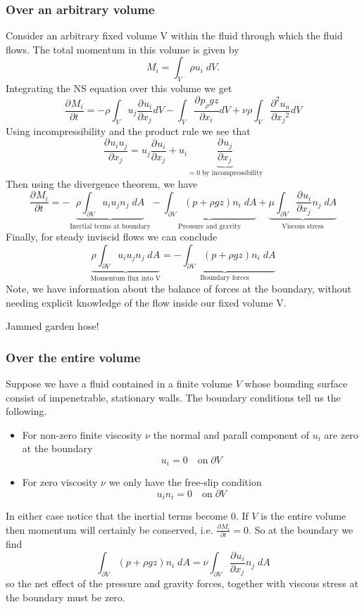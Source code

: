 \documentclass[11pt]{article}
\newcommand*{\pd}[3][]{\ensuremath{\frac{\partial^{#1} {#2}}{\partial {#3}^{#1}}}}
\newenvironment{eg}
    {\begin{mdframed}[backgroundcolor=mylg, roundcorner=5pt, linewidth=0pt]}
    {\end{mdframed}}
\begin{document}
\subsubsection{Over an arbitrary volume}
Consider an arbitrary fixed volume V within the fluid through which the fluid flows.
The total momentum in this volume is given by
$$M_i=\int_V \rho u_i\;dV.$$
Integrating the NS equation over this volume we get
$$\pd{M_i}{t}=-\rho\int_V u_j\pd{u_i}{x_j}dV-\int_V\pd{p_\rho gz}{x_i}dV + \nu\rho\int_V \pd[2]{u_u}{x_j}dV$$
Using incompressibility and the product rule we see that
$$\pd{u_iu_j}{x_j}=u_j\pd{u_i}{x_j}+u_i\underbrace{\pd{u_j}{x_j}}_{=0 \;\text{by incompressibility}}$$
Then using the divergence theorem, we have
$$\pd{M_i}{t}=-\underbrace{\rho\int_{\partial V}u_iu_jn_j\;dA}_{\text{Inertial terms at boundary}}-\underbrace{\int_{\partial V}(p+\rho gz)n_i\;dA}_{\text{Pressure and gravity}}+\underbrace{\mu\int_{\partial V}\pd{u_i}{x_j}n_j\;dA}_{\text{Viscous stress}}$$
Finally, for steady inviscid flows we can conclude
$$\underbrace{\rho\int_{\partial V}u_iu_jn_j\;dA}_{\text{Momentum flux into V}}=\underbrace{-\int_{\partial V}(p + \rho gz)n_i\;dA}_{\text{Boundary forces}}$$
Note, we have information about the balance of forces at the boundary, without needing explicit knowledge of the flow inside our fixed volume V.
\begin{eg}
Jammed garden hose!
\end{eg}
\subsubsection{Over the entire volume}
Suppose we have a fluid contained in a finite volume $V$ whose bounding surface consist of impenetrable, stationary walls. The boundary conditions tell us the following.
\begin{itemize}
	\item For non-zero finite viscosity $\nu$ the normal and parall component of $u_i$ are zero at the boundary
		$$u_i=0\quad\text{on}\;\partial V$$
	\item For zero viscosity $\nu$ we only have the free-slip condition
		$$u_in_i=0\quad\text{on}\;\partial V$$
\end{itemize}
In either case notice that the inertial terms become 0.
If $V$ is the entire volume then momentum will certainly be conserved, i.e. $\pd{M_i}{t}=0$.
So at the boundary we find
$$\int_{\partial V}(p+\rho g z)n_i\;dA=\nu\int_{\partial V}\pd{u_i}{x_j}n_j\;dA$$
so the net effect of the pressure and gravity forces, together with viscous stress at the boundary must be zero.
\end{document}
